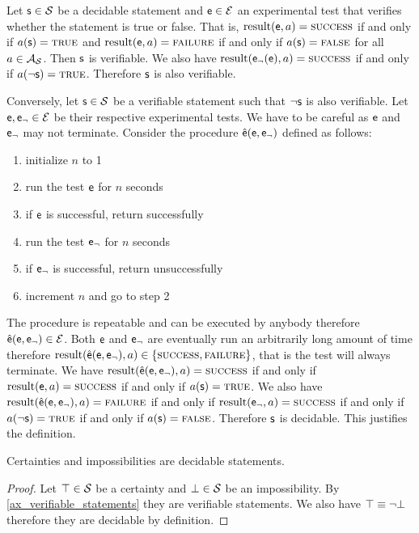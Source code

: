 \documentclass[11pt,letterpaper,fleqn]{memoir} %
\begin{document}
\begin{mathSection}
\begin{justification}
		Let $\mathsf{s} \in \mathcal{S}$ be a decidable statement and $\mathsf{e} \in \mathcal{E}$ an experimental test that verifies whether the statement is true or false. That is, $\operatorname{result}(\mathsf{e}, a) = \textsc{success}$ if and only if $a(\mathsf{s}) = \textsc{true}$ and $\operatorname{result}(\mathsf{e}, a) = \textsc{failure}$ if and only if $a(\mathsf{s}) = \textsc{false}$ for all $a \in \mathcal{A}_{\mathcal{S}}$. Then $\mathsf{s}$ is verifiable. We also have $\operatorname{result}(\mathsf{e}_\neg(\mathsf{e}), a) = \textsc{success}$ if and only if $a(\neg\mathsf{s}) = \textsc{true}$. Therefore $\mathsf{s}$ is also verifiable.

		Conversely, let $\mathsf{s} \in \mathcal{S}$ be a verifiable statement such that $\neg\mathsf{s}$ is also verifiable. Let $\mathsf{e}, \mathsf{e}_\neg \in \mathcal{E}$ be their respective experimental tests. We have to be careful as $\mathsf{e}$ and $\mathsf{e}_\neg$ may not terminate. Consider the procedure $\hat{\mathsf{e}}(\mathsf{e}, \mathsf{e}_\neg)$ defined as follows:
		\begin{enumerate}
			\item initialize $n$ to 1
			\item run the test $\mathsf{e}$ for $n$ seconds
			\item if $\mathsf{e}$ is successful, return successfully
			\item run the test $\mathsf{e}_\neg$ for $n$ seconds
			\item if $\mathsf{e}_\neg$ is successful, return unsuccessfully
			\item increment $n$ and go to step 2
		\end{enumerate}
	    The procedure is repeatable and can be executed by anybody therefore $\hat{\mathsf{e}}(\mathsf{e}, \mathsf{e}_\neg) \in \mathcal{E}$. Both $\mathsf{e}$ and $\mathsf{e}_\neg$ are eventually run an arbitrarily long amount of time therefore $\operatorname{result}(\hat{\mathsf{e}}(\mathsf{e}, \mathsf{e}_\neg), a) \in \{\textsc{success}, \textsc{failure} \}$, that is the test will always terminate. We have $\operatorname{result}(\hat{\mathsf{e}}(\mathsf{e}, \mathsf{e}_\neg), a) = \textsc{success} $ if and only if $\operatorname{result}(\mathsf{e}, a) = \textsc{success}$ if and only if $a(\mathsf{s}) = \textsc{true}$. We also have $\operatorname{result}(\hat{\mathsf{e}}(\mathsf{e}, \mathsf{e}_\neg), a) = \textsc{failure}$ if and only if $\operatorname{result}(\mathsf{e}_\neg, a) = \textsc{success}$ if and only if $a(\neg\mathsf{s}) = \textsc{true}$ if and only if $a(\mathsf{s}) = \textsc{false}$. Therefore $\mathsf{s}$ is decidable. This justifies the definition.
	\end{justification}

\begin{coro}
	Certainties and impossibilities are decidable statements.
\end{coro}
\begin{proof}
	Let $\top \in \mathcal{S}$ be a certainty and $\bot \in \mathcal{S}$ be an impossibility. By \ref{ax_verifiable_statements} they are verifiable statements. We also have $\top \equiv \neg \bot$ therefore they are decidable by definition.
\end{proof}

\end{mathSection}
\end{document}
